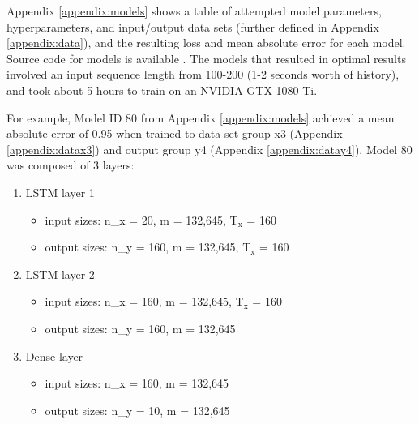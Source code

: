 \documentclass{article}
\begin{document}
Appendix \ref{appendix:models} shows a table of attempted model parameters, hyperparameters, and input/output data sets (further defined in Appendix \ref{appendix:data}), and the resulting loss and mean absolute error for each model. Source code for models is available \cite{casterton_2019}. The models that resulted in optimal results involved an input sequence length from 100-200 (1-2 seconds worth of history), and took about 5 hours to train on an NVIDIA GTX 1080 Ti.

For example, Model ID 80 from Appendix \ref{appendix:models} achieved a mean absolute error of 0.95 when trained to data set group x3 (Appendix \ref{appendix:datax3}) and output group y4 (Appendix  \ref{appendix:datay4}). Model 80 was composed of 3 layers:
 
 \begin{enumerate}
    \item LSTM layer 1
    \begin{itemize}
        \item input sizes: n\_x = 20, m = 132,645, T$_{\text{x}}$ = 160
        \item output sizes: n\_y = 160, m = 132,645, T$_{\text{x}}$ = 160
    \end{itemize}
    \item LSTM layer 2
    \begin{itemize}
        \item input sizes: n\_x = 160, m = 132,645, T$_{\text{x}}$ = 160
        \item output sizes: n\_y = 160, m = 132,645
    \end{itemize}
    \item Dense layer
    \begin{itemize}
        \item input sizes: n\_x = 160, m = 132,645
        \item output sizes: n\_y = 10, m = 132,645
    \end{itemize}
\end{enumerate}
 
\end{document}
